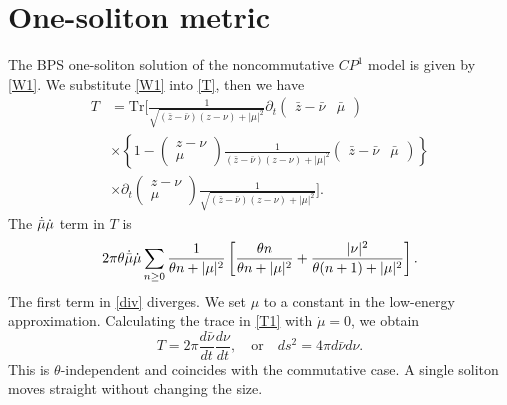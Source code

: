 \documentclass[a4paper,12pt]{article}
\begin{document}
\section{One-soliton metric}
The BPS one-soliton solution of the noncommutative $CP^1$ model is given by \eqref{W1}.
We substitute \eqref{W1} into \eqref{T}, then we have
\begin{equation}
\begin{split}\label{T1}
T&=\mbox{Tr}
\Bigg[
\frac{1}{\sqrt{(\bar{z}-\bar{\nu})(z-\nu)+|\mu|^2}}\partial_t 
\begin{pmatrix} \bar{z}-\bar{\nu} & \bar{\mu} \end{pmatrix}\\
&\times\left\{1-
\begin{pmatrix} z-\nu \\ \mu \end{pmatrix}
\frac{1}{(\bar{z}-\bar{\nu})(z-\nu)+|\mu|^2}
\begin{pmatrix} \bar{z}-\bar{\nu} & \bar{\mu} \end{pmatrix}
\right\}\\
&\times\partial_t
\begin{pmatrix} z-\nu \\ \mu \end{pmatrix}
\frac{1}{\sqrt{(\bar{z}-\bar{\nu})(z-\nu)+|\mu|^2}}
\Bigg].
\end{split}
\end{equation}
The $\Dot{\Bar{\mu}}\dot{\mu}$ term in $T$ is
\begin{equation}
2\pi\theta\Dot{\Bar{\mu}}\dot{\mu} \sum_{n\ge 0}\frac{1}{\theta n+|\mu|^2}\left[\frac{\theta n}{\theta n+|\mu|^2}
+\frac{|\nu|^2}{\theta(n+1)+|\mu|^2}\right].\label{div}
\end{equation}
The first term in \eqref{div} diverges. We set $\mu$ to a constant in the low-energy approximation.
Calculating the trace in \eqref{T1} with $\dot{\mu}=0$, we obtain
\begin{equation}
T=2\pi\frac{d\bar{\nu}}{dt}\frac{d\nu}{dt},
 \quad \text{or} \quad ds^2=4\pi d\bar{\nu}d\nu.\label{metric1}
\end{equation}
This is $\theta$-independent and coincides with the commutative case. A single soliton moves 
straight without changing the size.
\end{document}
